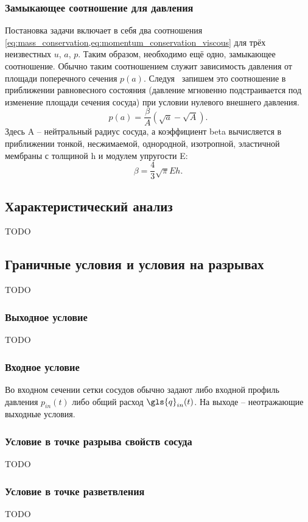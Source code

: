 \subsubsection{Замыкающее соотношение для давления}
Постановка задачи включает в себя два соотношения \cref{eq:mass_conservation,eq:momentum_conservation_viscous}
для трёх неизвестных $u$, $a$, $p$. Таким образом, необходимо ещё одно,
замыкающее соотношение.
Обычно таким соотношением служит зависимость давления от площади поперечного сечения $p(a)$.
Следуя~\cite{Formaggia2003} запишем это соотношение в приближении равновесного состояния (давление мгновенно подстраивается под изменение площади сечения сосуда)
при условии нулевого внешнего давления.
\begin{equation}
\nonumber
p(a) = \frac{\beta}{A} \left(\sqrt{a} - \sqrt A\right).
\end{equation}
Здесь \gls{A} -- нейтральный радиус сосуда,
а коэффициент \gls{beta} вычисляется в приближении тонкой, несжимаемой, однородной, изотропной, эластичной мембраны с толщиной \gls{h} и 
модулем упругости \gls{E}:
\begin{equation}
\nonumber
\beta = \frac{4}{3}\sqrt{\pi}E h.
\end{equation}

\subsection{Характеристический анализ}
TODO

\subsection{Граничные условия и условия на разрывах}
TODO

\subsubsection{Выходное условие}
TODO

\subsubsection{Входное условие}
Во входном сечении сетки сосудов обычно задают либо входной профиль давления $p_{in}(t)$
либо общий расход $\gls{q}_{in}(t)$. На выходе -- неотражающие выходные условия.

\subsubsection{Условие в точке разрыва свойств сосуда}
TODO

\subsubsection{Условие в точке разветвления}
TODO
